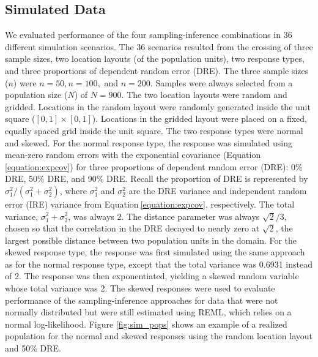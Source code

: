 \documentclass[]{elsarticle} %
\begin{document}
\hypertarget{sec:mm_sim}{%
\subsection{Simulated Data}\label{sec:mm_sim}}

We evaluated performance of the four sampling-inference combinations in
36 different simulation scenarios. The 36 scenarios resulted from the
crossing of three sample sizes, two location layouts (of the population
units), two response types, and three proportions of dependent random
error (DRE). The three sample sizes (\(n\)) were \(n = 50, n = 100,\)
and \(n = 200\). Samples were always selected from a population size
(\(N\)) of \(N = 900\). The two location layouts were random and
gridded. Locations in the random layout were randomly generated inside
the unit square (\([0, 1] \times [0, 1]\)). Locations in the gridded
layout were placed on a fixed, equally spaced grid inside the unit
square. The two response types were normal and skewed. For the normal
response type, the response was simulated using mean-zero random errors
with the exponential covariance (Equation\(~\)\ref{equation:expcov}) for
three proportions of dependent random error (DRE): 0\% DRE, 50\% DRE,
and 90\% DRE. Recall the proportion of DRE is represented by
\(\sigma^2_1 / (\sigma^2_1 + \sigma^2_2)\), where \(\sigma^2_1\) and
\(\sigma^2_2\) are the DRE variance and independent random error (IRE)
variance from Equation\(~\)\ref{equation:expcov}, respectively. The
total variance, \(\sigma^2_1 + \sigma^2_2\), was always 2. The distance
parameter was always \(\sqrt{2} / 3\), chosen so that the correlation in
the DRE decayed to nearly zero at \(\sqrt{2}\), the largest possible
distance between two population units in the domain. For the skewed
response type, the response was first simulated using the same approach
as for the normal response type, except that the total variance was
0.6931 instead of 2. The response was then exponentiated, yielding a
skewed random variable whose total variance was 2. The skewed responses
were used to evaluate performance of the sampling-inference approaches
for data that were not normally distributed but were still estimated
using REML, which relies on a normal log-likelihood. Figure
\ref{fig:sim_pops} shows an example of a realized population for the
normal and skewed responses using the random location layout and 50\%
DRE.
\end{document}
